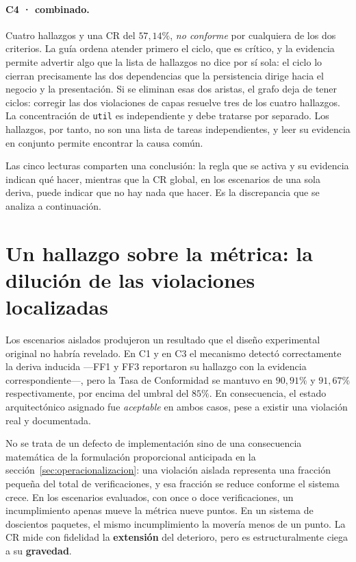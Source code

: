 \paragraph{C4 · combinado.} Cuatro hallazgos y una CR del $57{,}14\%$, \textit{no conforme} por cualquiera de los dos criterios. La guía ordena atender primero el ciclo, que es crítico, y la evidencia permite advertir algo que la lista de hallazgos no dice por sí sola: el ciclo lo cierran precisamente las dos dependencias que la persistencia dirige hacia el negocio y la presentación. Si se eliminan esas dos aristas, el grafo deja de tener ciclos: corregir las dos violaciones de capas resuelve tres de los cuatro hallazgos. La concentración de \texttt{util} es independiente y debe tratarse por separado. Los hallazgos, por tanto, no son una lista de tareas independientes, y leer su evidencia en conjunto permite encontrar la causa común.

Las cinco lecturas comparten una conclusión: la regla que se activa y su evidencia indican qué hacer, mientras que la CR global, en los escenarios de una sola deriva, puede indicar que no hay nada que hacer. Es la discrepancia que se analiza a continuación.

\section{Un hallazgo sobre la métrica: la dilución de las violaciones localizadas}
\label{sec:dilucion}
Los escenarios aislados produjeron un resultado que el diseño experimental original no habría revelado. En C1 y en C3 el mecanismo detectó correctamente la deriva inducida ---FF1 y FF3 reportaron su hallazgo con la evidencia correspondiente---, pero la Tasa de Conformidad se mantuvo en $90{,}91\%$ y $91{,}67\%$ respectivamente, por encima del umbral del $85\%$. En consecuencia, el estado arquitectónico asignado fue \textit{aceptable} en ambos casos, pese a existir una violación real y documentada.

No se trata de un defecto de implementación sino de una consecuencia matemática de la formulación proporcional anticipada en la sección~\ref{sec:operacionalizacion}: una violación aislada representa una fracción pequeña del total de verificaciones, y esa fracción se reduce conforme el sistema crece. En los escenarios evaluados, con once o doce verificaciones, un incumplimiento apenas mueve la métrica nueve puntos. En un sistema de doscientos paquetes, el mismo incumplimiento la movería menos de un punto. La CR mide con fidelidad la \textbf{extensión} del deterioro, pero es estructuralmente ciega a su \textbf{gravedad}.


